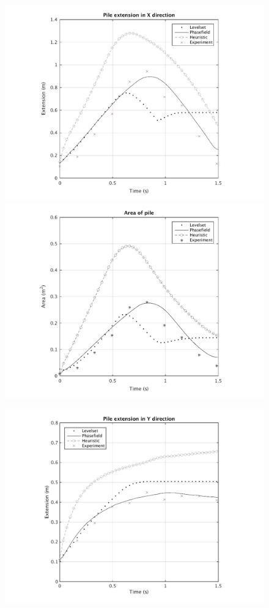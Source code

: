 \documentclass[letterpaper,10pt]{article}
\begin{document}
\begin{figure}[H]
  \begin{minipage}[b]{.48\linewidth}
    \centering
    \includegraphics[scale=0.48]{IMAGES/xextend.png}
    \includegraphics[scale=0.48]{IMAGES/area.png}
  \end{minipage}
  \begin{minipage}[b]{.48 \linewidth}
    \centering
    \includegraphics[scale=0.48]{IMAGES/yextend.png}

\end{minipage}
\end{figure}
\end{document}
